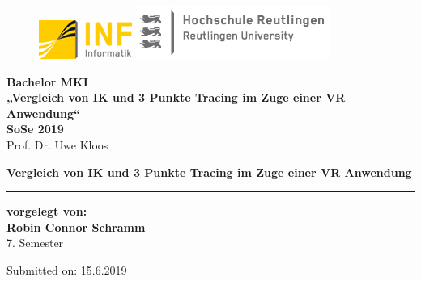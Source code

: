 \begin{titlepage}

\begin{center}

\begin{figure}
\begin{minipage}[H]{4cm}
\centering
\includegraphics[width=0.8\linewidth]{Bilder/Deckblatt/universityLogo}
\end{minipage}
\hfill
\begin{minipage}[H]{6cm}
\centering
\includegraphics[width=1\linewidth]{Bilder/Deckblatt/CompanyLogo}
\end{minipage}
\end{figure}

\vspace*{0.8cm}

\textbf{Bachelor MKI}\\
\textbf{„Vergleich von IK und 3 Punkte Tracing im Zuge einer VR Anwendung“} \\
\vspace*{0.2cm}
{\large \textbf{SoSe 2019\\}}
\vspace*{0.4cm}
Prof. Dr. Uwe Kloos\\
\vspace*{0.8cm}

\textbf{{\large {\Large Vergleich von IK und 3 Punkte Tracing im Zuge einer VR Anwendung }}}\\

\noindent\rule{\textwidth}{2pt}
\vspace*{0.6cm}

\textbf{vorgelegt von:\\}
{\large \textbf{Robin Connor Schramm\\}}
7. Semester 

\vspace*{0.6cm}

\vspace*{0.6cm}

Submitted on:	15.6.2019



\end{center}

\end{titlepage}